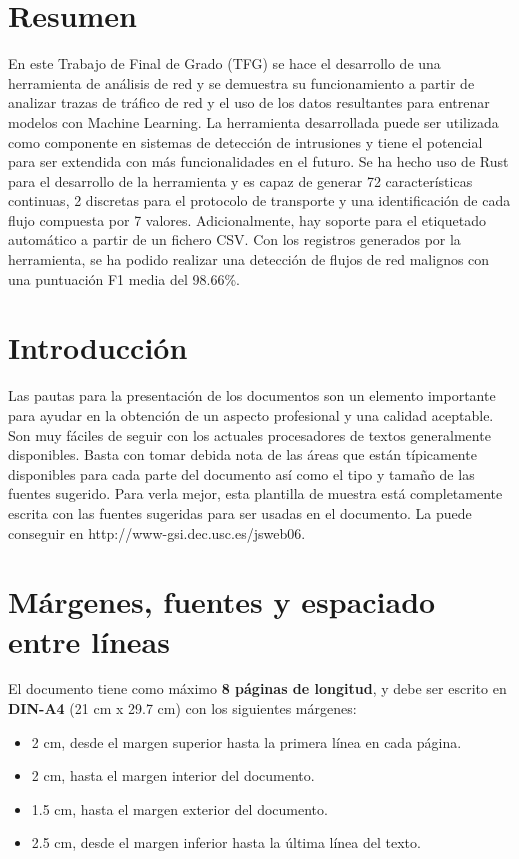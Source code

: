 \documentclass[10pt,a4paper,twoside]{article}
\begin{document}
\begin{multicols}{2}
    \section*{Resumen}

    En este Trabajo de Final de Grado (TFG) se hace el desarrollo de una herramienta de análisis de red y se demuestra su funcionamiento a partir de analizar trazas de tráfico de red y el uso de los datos resultantes para entrenar modelos con Machine Learning. La herramienta desarrollada puede ser utilizada como componente en sistemas  de detección de intrusiones y tiene el potencial para ser extendida con más funcionalidades en el futuro. Se ha hecho uso de Rust para el desarrollo de la herramienta y es capaz de generar 72 características continuas, 2 discretas para el protocolo de transporte y una identificación de cada flujo compuesta por 7 valores. Adicionalmente, hay soporte para el etiquetado automático a partir de un fichero CSV. Con los registros generados por la herramienta, se ha podido realizar una detección de flujos de red malignos con una puntuación F1 media del 98.66\%.

    \section{Introducción}

    Las pautas para la presentación de los documentos son un elemento importante para ayudar en la obtención de un aspecto profesional y una calidad aceptable. Son muy fáciles de seguir con los actuales procesadores de textos generalmente disponibles. Basta con tomar debida nota de las áreas que están típicamente disponibles para cada parte del documento así como el tipo y tamaño de las fuentes sugerido. Para verla mejor, esta plantilla de muestra está completamente escrita con las fuentes sugeridas para ser usadas en el documento. La puede conseguir en http://www-gsi.dec.usc.es/jsweb06.

    \section{Márgenes, fuentes y espaciado entre líneas}

    El documento tiene como máximo \textbf{8 páginas de longitud}, y debe ser escrito en \textbf{DIN-A4} (21 cm x 29.7 cm) con los siguientes márgenes:

    \begin{itemize}
        \item 2 cm, desde el margen superior hasta la primera línea en cada página.
        \item 2 cm, hasta el margen interior del documento.
        \item 1.5 cm, hasta el margen exterior del documento.
        \item 2.5 cm, desde el margen inferior hasta la última línea del texto.
    \end{itemize}


\end{multicols}
\end{document}
